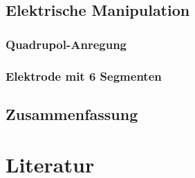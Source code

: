\documentclass[numbers=noenddot,a4paper]{scrartcl}
\begin{document}
        \subsection{Elektrische Manipulation}

            \subsubsection{Quadrupol-Anregung}

            \subsubsection{Elektrode mit 6 Segmenten}

         \subsection{Zusammenfassung}

	\newpage

	\section{Literatur}\label{sec:lit}

		
		

%

%		
%
\end{document}
